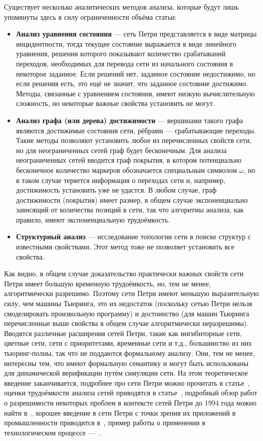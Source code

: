 \documentclass[conference]{IEEEtran}
\begin{document}
Существует несколько аналитических методов анализа, которые будут лишь упомянуты 
здесь в силу ограниченности объёма статьи:
\begin{itemize}
  \item \textbf{Анализ уравнения состояния} --- сеть Петри представляется в виде матрицы 
    инцидентности, тогда текущее состояние выражается в виде линейного уравнения, 
    решения которого показывают количество срабатываний переходов, необходимых 
    для перевода сети из начального состояния в некоторое заданное. Если решений 
    нет, заданное состояние недостижимо, но если решения есть, это ещё не значит, 
    что заданное состояние достижимо. Методы, связанные с уравнением состояния, 
    имеют низкую вычислительную сложность, но некоторые важные свойства установить 
    не могут.
  \item \textbf{Анализ графа (или дерева) достижимости} --- вершинами такого графа 
    являются достижимые состояния сети, рёбрами --- срабатывающие переходы. Такие 
    методы позволяют установить любое из перечисленных свойств сети, но для 
    неограниченных сетей граф будет бесконечным. Для анализа неограниченных сетей 
    вводится граф покрытия, в котором потенциально бесконечное количество маркеров 
    обозначается специальным символом $\omega$, но в таком случае теряется 
    информация о переходах сети и, например, достижимость установить уже 
    не удастся. В любом случае, граф достижимости (покрытия) имеет размер, в 
    общем случае экспоненциально зависящий от количества позиций в сети, так что 
    алгоритмы анализа, как правило, имеют экспоненциальную трудоёмкость.
  \item \textbf{Структурный анализ} --- исследование топологии сети в поиске структур с 
    известными свойствами. Этот метод тоже не позволяет установить все свойства.
\end{itemize}

Как видно, в общем случае доказательство практически важных свойств сети Петри 
имеет большую временную трудоёмкость, но, тем не менее, алгоритмически разрешимо. 
Поэтому сети Петри имеют меньшую выразительную силу, чем машины Тьюринга, это их 
недостаток (поскольку сетью Петри нельзя смоделировать произвольную программу) и 
достоинство (для машин Тьюринга перечисленные выше свойства в общем случае 
алгоритмически неразрешимы). Вводятся различные расширения сетей Петри, такие 
как ингибиторные сети, цветные сети, сети с приоритетами, временные сети и т.д., 
большинство из них тьюринг-полны, так что не поддаются формальному анализу. 
Они, тем не менее, интересны тем, что имеют формальную семантику и могут быть 
использованы для динамической верификации путём симуляции сети. На этом 
теоретическое введение заканчивается, подробнее про сети Петри можно прочитать в 
статье~\cite{murata1989petri}, оценки трудоёмкости анализа сетей приводятся в 
статье~\cite{yen2006petri}, подробный обзор работ о разрешимости некоторых проблем в контексте 
сетей Петри до 1994 года можно найти в~\cite{esparza1994decidability}, хорошее введение в сети Петри 
с точки зрения их приложений в промышленности приводится в~\cite{zurawski1994petri}, 
пример работы о применении в технологическом процессе ---~\cite{martynov2014petri}.
\end{document}
